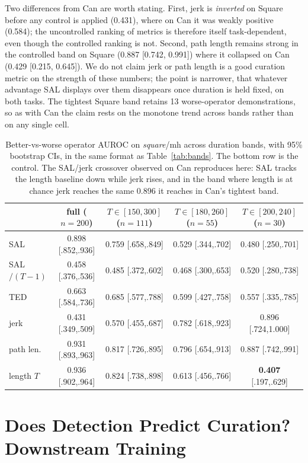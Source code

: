 \documentclass{article}
\begin{document}
Two differences from Can are worth stating. First, jerk is \emph{inverted}
on Square before any control is applied (0.431), where on Can it was weakly
positive (0.584); the uncontrolled ranking of metrics is therefore itself
task-dependent, even though the controlled ranking is not. Second, path
length remains strong in the controlled band on Square (0.887 [0.742,
0.991]) where it collapsed on Can (0.429 [0.215, 0.645]). We do not claim
jerk or path length is a good curation metric on the strength of these
numbers; the point is narrower, that whatever advantage SAL displays over
them disappears once duration is held fixed, on both tasks. The tightest
Square band retains 13 worse-operator demonstrations, so as with Can the
claim rests on the monotone trend across bands rather than on any single
cell.

\begin{table}[t]
\centering
\small
\begin{tabular}{lcccc}
\toprule
& full ($n{=}200$) & $T \in [150,300]$ ($n{=}111$) & $T \in [180,260]$ ($n{=}55$) & $T \in [200,240]$ ($n{=}30$) \\
\midrule
SAL       & 0.898 [.852,.936] & 0.759 [.658,.849] & 0.529 [.344,.702] & 0.480 [.250,.701] \\
SAL$/(T{-}1)$ & 0.458 [.376,.536] & 0.485 [.372,.602] & 0.468 [.300,.653] & 0.520 [.280,.738] \\
TED       & 0.663 [.584,.736] & 0.685 [.577,.788] & 0.599 [.427,.758] & 0.557 [.335,.785] \\
jerk      & 0.431 [.349,.509] & 0.570 [.455,.687] & 0.782 [.618,.923] & 0.896 [.724,1.000] \\
path len. & 0.931 [.893,.963] & 0.817 [.726,.895] & 0.796 [.654,.913] & 0.887 [.742,.991] \\
\midrule
length $T$ & 0.936 [.902,.964] & 0.824 [.738,.898] & 0.613 [.456,.766] & \textbf{0.407} [.197,.629] \\
\bottomrule
\end{tabular}
\caption{Better-vs-worse operator AUROC on \emph{square}/mh across duration
bands, with 95\% bootstrap CIs, in the same format as
Table~\ref{tab:bands}. The bottom row is the control. The SAL/jerk
crossover observed on Can reproduces here: SAL tracks the length baseline
down while jerk rises, and in the band where length is at chance jerk
reaches the same 0.896 it reaches in Can's tightest band.}
\label{tab:square}
\end{table}

\section{Does Detection Predict Curation? Downstream Training}
\label{sec:training}
\end{document}
